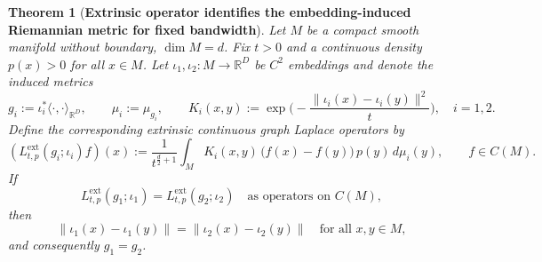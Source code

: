 \documentclass[10pt,a4paper]{amsart}
\newtheorem{theorem}{Theorem}
\newcommand{\Ddim}{\mathbb{R}^D}
\begin{document}
\begin{theorem}[\textbf{Extrinsic operator identifies the embedding-induced Riemannian metric for fixed bandwidth}]
\label{thm:extrinsic_induced_metric_identifiable}
Let $M$ be a compact smooth manifold without boundary, $\dim M=d$.
Fix $t>0$ and a continuous density $p(x)>0$ for all $x\in M$.
Let $\iota_1,\iota_2:M\to {\Ddim}$ be $C^2$ embeddings and denote the induced metrics
\[
g_i:=\iota_i^*\langle\cdot,\cdot\rangle_{{\Ddim}},
\qquad \mu_i:=\mu_{g_i},
\qquad 
K_i(x,y):=\exp\!\Big(-\frac{\|\iota_i(x)-\iota_i(y)\|^2}{t}\Big),
\quad i=1,2.
\]
Define the corresponding extrinsic continuous graph Laplace operators by
\[
(L^{\mathrm{ext}}_{t,p}(g_i;\iota_i)f)(x)
:=\frac{1}{t^{\frac d2+1}}
\int_M K_i(x,y)\,\bigl(f(x)-f(y)\bigr)\,p(y)\,d\mu_i(y),
\qquad f\in C(M).
\]
If
\[
L^{\mathrm{ext}}_{t,p}(g_1;\iota_1)=L^{\mathrm{ext}}_{t,p}(g_2;\iota_2)
\quad\text{as operators on }C(M),
\]
then
\[
\|\iota_1(x)-\iota_1(y)\|
=\|\iota_2(x)-\iota_2(y)\|
\quad\text{for all }x,y\in M,
\]
and consequently $g_1=g_2$.
\end{theorem}
\end{document}
